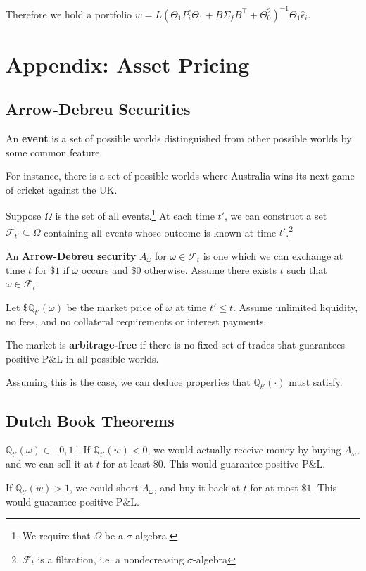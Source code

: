 \documentclass{article}
\begin{document}
Therefore we hold a portfolio $w = L(\Theta_1 P^\epsilon_i \Theta_1 + B\Sigma_f B^\top + \Theta_0^2)^{-1} \Theta_1\hat{\epsilon}_i$.

\section{Appendix: Asset Pricing}
\subsection{Arrow-Debreu Securities}
An \textbf{event} is a set of possible worlds distinguished from other possible worlds by some common feature.

For instance, there is a set of possible worlds where Australia wins its next game of cricket against the UK.%

Suppose $\Omega$ is the set of all events.\footnote{We require that $\Omega$ be a $\sigma$-algebra.} At each time $t'$, we can construct a set $\mathcal{F}_{t'}\subseteq \Omega$ containing all events whose outcome is known at time $t'$.\footnote{$\mathcal{F}_t$ is a filtration, i.e. a nondecreasing $\sigma$-algebra}

An \textbf{Arrow-Debreu security} $A_\omega$ for $\omega\in \mathcal{F}_t$ is one which we can exchange at time $t$ for $\$1$ if $\omega$ occurs and $\$0$ otherwise. Assume there exists $t$ such that $\omega\in\mathcal{F}_t$.

Let $\$\mathbb{Q}_{t'}(\omega)$ be the market price of $\omega$ at time $t'\leq t$. Assume unlimited liquidity, no fees, and no collateral requirements or interest payments.

The market is \textbf{arbitrage-free} if there is no fixed set of trades that guarantees positive P\&L in all possible worlds.

Assuming this is the case, we can deduce properties that $\mathbb{Q}_{t'}(\cdot)$ must satisfy.

\subsection{Dutch Book Theorems}
\begin{block}{$\mathbb{Q}_{t'}(\omega) \in [0,1]$}
	If $\mathbb{Q}_{t'}(w)<0$, we would actually receive money by buying $A_\omega$, and we can sell it at $t$ for at least $\$0$. This would guarantee positive P\&L.

	If $\mathbb{Q}_{t'}(w)>1$, we could short $A_\omega$, and buy it back at $t$ for at most $\$1$. This would guarantee positive P\&L.
\end{block}
\end{document}
